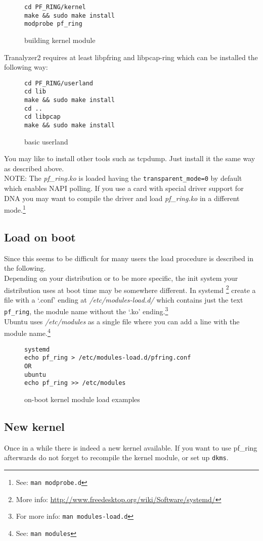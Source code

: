 \documentclass[documentation]{subfiles}
\begin{document}
\begin{figure}[ht]
\centering
\begin{lstlisting}
cd PF_RING/kernel
make && sudo make install
modprobe pf_ring
\end{lstlisting}
\caption{building kernel module}
\end{figure}

Tranalyzer2 requires at least libpfring and libpcap-ring which can be installed the following way:
\begin{figure}[ht]
\centering
\begin{lstlisting}
cd PF_RING/userland
cd lib
make && sudo make install
cd ..
cd libpcap
make && sudo make install
\end{lstlisting}
\caption{basic userland}
\end{figure}

You may like to install other tools such as tcpdump. Just install it the same way as described above.\\
NOTE: The {\em pf\_ring.ko} is loaded having the {\tt transparent\_mode=0} by default which enables NAPI polling. If you use a card with special driver support for DNA  you may want to compile the driver and load {\em pf\_ring.ko} in a different mode.\footnote{See: {\tt man modprobe.d}}

\subsection*{Load on boot}
Since this seems to be difficult for many users the load procedure is described in the following.\\
Depending on your distribution or to be more specific, the init system your distribution uses at boot time may be somewhere different. In systemd \footnote{More info: \url{http://www.freedesktop.org/wiki/Software/systemd/}} create a file with a `.conf' ending at {\em /etc/modules-load.d/} which contains just the text {\tt pf\_ring}, the module name without the `.ko' ending.\footnote{For more info: {\tt man modules-load.d}}\\
Ubuntu uses {\em /etc/modules} as a single file where you can add a line with the module name.\footnote{See: {\tt man modules}}

\begin{figure}[ht]
\centering
\begin{lstlisting}
systemd
echo pf_ring > /etc/modules-load.d/pfring.conf
OR
ubuntu
echo pf_ring >> /etc/modules
\end{lstlisting}
\caption{on-boot kernel module load examples}
\end{figure}

\subsection*{New kernel}
Once in a while there is indeed a new kernel available. If you want to use pf\_ring afterwards do not forget to recompile the kernel module, or set up {\tt dkms}.
\end{document}
